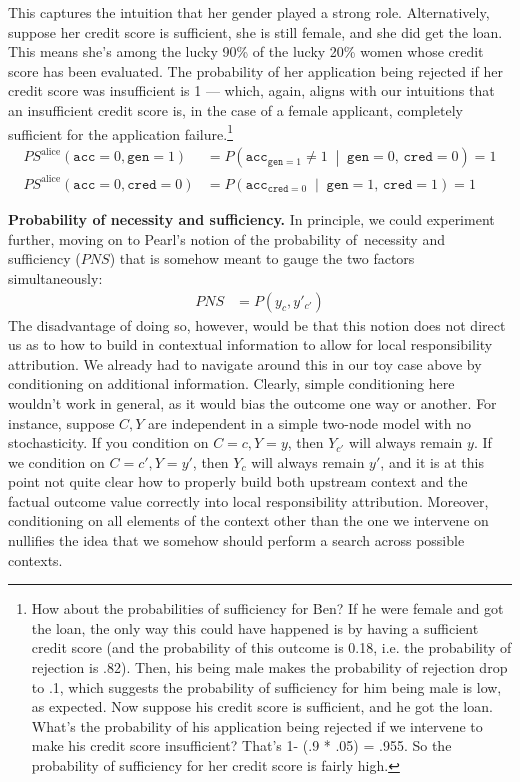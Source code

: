 \documentclass[twoside,11pt]{article}
\begin{document}
This captures the intuition that her gender played a strong role. Alternatively, suppose her credit score is sufficient, she is still female, and she did get the loan. This means she's among the lucky 90\% of the lucky 20\% women whose credit score has been evaluated. The probability of her application being rejected if her credit score was insufficient is 1 --- which, again, aligns with our intuitions that an insufficient credit score is, in the case of a female applicant, completely sufficient for the application failure.\footnote{How about the probabilities of sufficiency for Ben? If he were female and got the loan, the only way this could have happened is by having a sufficient credit score (and the probability of this outcome is 0.18, i.e. the probability of rejection is  .82). Then, his being male makes the probability of rejection drop to .1, which suggests the probability of sufficiency for him being male is low, as expected. Now suppose his credit score is sufficient, and he got the loan. What's the probability of his application being rejected if we intervene to make his credit score insufficient?  That's 1- (.9 * .05) = .955. So the probability of sufficiency for her credit score is fairly high.}
\begin{align*}
\mathit{PS}^{\text{alice}}(\mathtt{acc} = 0, \mathtt{gen} = 1) 
  &= P\!\left(
      \mathtt{acc}_{\mathtt{gen} = 1} \neq 1 \;\middle|\;
      \mathtt{gen} = 0,\, \mathtt{cred} = 0
    \right) = 1 \\
\mathit{PS}^{\text{alice}}(\mathtt{acc} = 0, \mathtt{cred} = 0) 
  &= P\!\left(
      \mathtt{acc}_{\mathtt{cred} = 0} \;\middle|\;
      \mathtt{gen} = 1,\, \mathtt{cred} = 1
    \right) = 1
\end{align*}


\vspace{2mm}
\noindent \textbf{Probability of necessity and sufficiency.} In principle, we could experiment further, moving on to Pearl's notion of the probability of necessity and sufficiency ($\mathit{PNS}$) that is somehow meant to gauge the two factors simultaneously:
\begin{align*}
PNS  & =  P(y_c, y'_{c'})
\end{align*}
\noindent The disadvantage of doing so, however, would be that this notion does not direct us as to how to build in contextual information to allow for local responsibility attribution. We already had to navigate around this in our toy case above by conditioning on additional information.  Clearly, simple conditioning here wouldn't work in general, as it would bias the outcome one way or another. For instance, suppose $C, Y$ are independent in a simple two-node model with no stochasticity. If you condition on $C =c, Y = y$, then $Y_{c'}$ will always remain $y$. If we condition on $C=c', Y=y'$, then $Y_{c}$ will always remain $y'$, and it is at this point not quite clear how to properly build both upstream context and the factual outcome value correctly into local responsibility attribution. Moreover, conditioning on all elements of the context other than the one we intervene on nullifies the idea that we somehow should perform a search across possible contexts.
\end{document}
